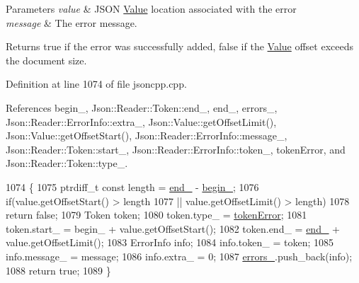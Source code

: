 \begin{DoxyParams}{Parameters}
{\em value} & J\+S\+ON \hyperlink{class_json_1_1_value}{Value} location associated with the error \\
\hline
{\em message} & The error message. \\
\hline
\end{DoxyParams}
\begin{DoxyReturn}{Returns}
{\ttfamily true} if the error was successfully added, {\ttfamily false} if the \hyperlink{class_json_1_1_value}{Value} offset exceeds the document size. 
\end{DoxyReturn}


Definition at line 1074 of file jsoncpp.\+cpp.



References begin\+\_\+, Json\+::\+Reader\+::\+Token\+::end\+\_\+, end\+\_\+, errors\+\_\+, Json\+::\+Reader\+::\+Error\+Info\+::extra\+\_\+, Json\+::\+Value\+::get\+Offset\+Limit(), Json\+::\+Value\+::get\+Offset\+Start(), Json\+::\+Reader\+::\+Error\+Info\+::message\+\_\+, Json\+::\+Reader\+::\+Token\+::start\+\_\+, Json\+::\+Reader\+::\+Error\+Info\+::token\+\_\+, token\+Error, and Json\+::\+Reader\+::\+Token\+::type\+\_\+.


\begin{DoxyCode}
1074                                                                         \{
1075   ptrdiff\_t \textcolor{keyword}{const} length = \hyperlink{class_json_1_1_reader_a714793579cbf4ee7c5a7223d2c8d77c1}{end\_} - \hyperlink{class_json_1_1_reader_a327166839022ea91f0a8290960a8af76}{begin\_};
1076   \textcolor{keywordflow}{if}(value.getOffsetStart() > length
1077     || value.getOffsetLimit() > length)
1078     \textcolor{keywordflow}{return} \textcolor{keyword}{false};
1079   Token token;
1080   token.type\_ = \hyperlink{class_json_1_1_reader_aa35e6ab574dc399a0a645ad98ed66bc9a55d1ab9135c3d068b57fafdbabfa569a}{tokenError};
1081   token.start\_ = begin\_ + value.getOffsetStart();
1082   token.end\_ = \hyperlink{class_json_1_1_reader_a714793579cbf4ee7c5a7223d2c8d77c1}{end\_} + value.getOffsetLimit();
1083   ErrorInfo info;
1084   info.token\_ = token;
1085   info.message\_ = message;
1086   info.extra\_ = 0;
1087   \hyperlink{class_json_1_1_reader_a1bbce45dc4df753bed60c129f4b5147c}{errors\_}.push\_back(info);
1088   \textcolor{keywordflow}{return} \textcolor{keyword}{true};
1089 \}
\end{DoxyCode}
\mbox{\label{class_json_1_1_reader_a3568be9db568ff57bd3fcc373143dff3}} 
